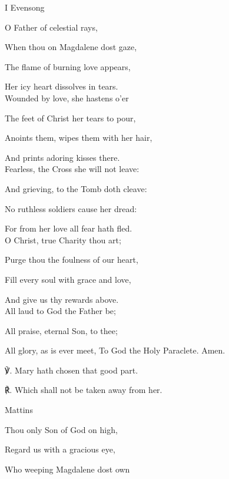 \begin{paracol}{2}[]
\sloppy
\begin{inhead}
	I Evensong
\end{inhead}
\begin{hangparas}{1.25em}{1}
O Father of celestial rays,
	
When thou on Magdalene dost gaze,

The flame of burning love appears,

Her icy heart dissolves in tears.\\

Wounded by love, she hastens o'er

The feet of Christ her tears to pour,

Anoints them, wipes them with her hair,

And prints adoring kisses there.\\

Fearless, the Cross she will not leave:

And grieving, to the Tomb doth cleave:

No ruthless soldiers cause her dread:

For from her love all fear hath fled.\\

O Christ, true Charity thou art;

Purge thou the foulness of our heart,

Fill every soul with grace and love,

And give us thy rewards above.\\

All laud to God the Father be;

All praise, eternal Son, to thee;

All glory, as is ever meet, To God the Holy Paraclete. Amen.\\
\end{hangparas}

    ℣. Mary hath chosen that good part.

	℟. Which shall not be taken away from her.

\switchcolumn

\begin{inhead}
	Mattins
\end{inhead}
\begin{hangparas}{1.25em}{1}
Thou only Son of God on high,

Regard us with a gracious eye,

Who weeping Magdalene dost own


\end{hangparas}
\end{paracol}
